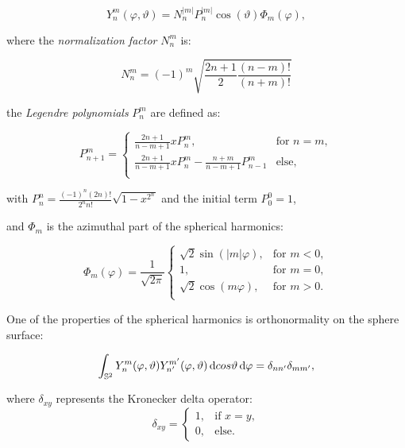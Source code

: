 \begin{equation}
	Y_n^m(\varphi, \vartheta) = N_n^{|m|} P_n^{|m|}\cos(\vartheta) \Phi_m(\varphi), 
	\label{eq:sphericalharmonics}
\end{equation}

where the \textit{normalization factor} $N_n^m$ is:

\begin{equation}
	N_n^m = (-1)^m \sqrt{\frac{2n+1}{2} \frac{(n-m)!}{(n+m)!}}
\end{equation}

the \textit{Legendre polynomials} $P_n^{m}$ are defined as: 

\begin{equation}
	P_{n+1}^{m} =
	\begin{cases}
 		\frac{2n+1}{n-m+1} x P_n^{m},  &\text{for } n = m,  \\
 		\frac{2n+1}{n-m+1} x P_n^{m} - \frac{n+m}{n-m+1}P_{n-1}^{m} &\text{else}, \\
 	\end{cases}
\end{equation}

with $P_{n}^{n} = \frac{(-1)^n(2n)!}{2^nn!}\sqrt{1-x^{2^n}}$
and the initial term $P_{0}^{0} = 1$, 

and $\Phi_m$ is the azimuthal part of the spherical harmonics: 

\begin{equation}
	\Phi_m(\varphi) = \frac{1}{\sqrt{2\pi}}
	\begin{cases}
    	\sqrt{2} \sin(|m|\varphi),  &\text{for } m < 0,  \\
    	1,  & \text{for } m = 0,  \\
    	\sqrt{2} \cos(m\varphi),  & \text{for } m > 0.  \\
  	\end{cases}
\end{equation}

\newpage

One of the properties of the spherical harmonics is orthonormality on the sphere surface:

\begin{equation}
	\int_{\mathbb{S}^2} Y_n^m(\varphi, \vartheta) Y_{n'}^{m'}(\varphi, \vartheta) \mathop{}\!\mathrm{d} cos{\vartheta} \mathop{}\!\mathrm{d} \varphi = \delta_{nn'} \delta_{mm'},
	\label{eq:orthonormality}
\end{equation}

where $\delta_{xy}$ represents the Kronecker delta operator:
\begin{equation}
	\delta_{xy} = \begin{cases}
		1,  &\text{if } x = y,\\
		0,  &\text{else}.
	\end{cases}
\end{equation}

